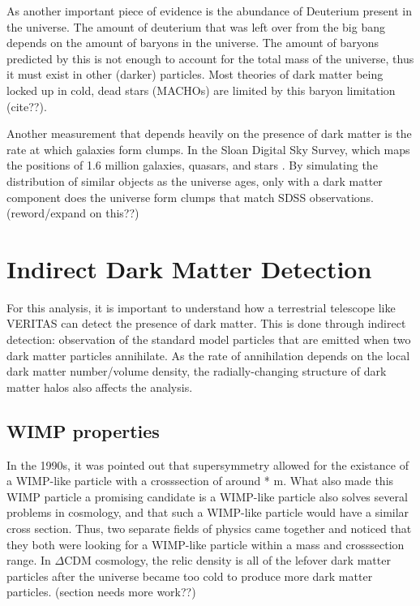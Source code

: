     As another important piece of evidence is the abundance of Deuterium present in the universe.
    The amount of deuterium that was left over from the big bang depends on the amount of baryons in the universe.
    The amount of baryons predicted by this is not enough to account for the total mass of the universe, thus it must exist in other (darker) particles.
    Most theories of dark matter being locked up in cold, dead stars (MACHOs) are limited by this baryon limitation (cite??).

    Another measurement that depends heavily on the presence of dark matter is the rate at which galaxies form clumps.
    In the Sloan Digital Sky Survey, which maps the positions of 1.6 million galaxies, quasars, and stars \cite{sdss_release}.
    By simulating the distribution of similar objects as the universe ages, only with a dark matter component does the universe form clumps that match SDSS observations.
    (reword/expand on this??)

\section{Indirect Dark Matter Detection}
  For this analysis, it is important to understand how a terrestrial telescope like VERITAS can detect the presence of dark matter.
  This is done through indirect detection: observation of the standard model particles that are emitted when two dark matter particles annihilate.
  As the rate of annihilation depends on the local dark matter number/volume density, the radially-changing structure of dark matter halos also affects the analysis.
  \subsection{WIMP properties}

    In the 1990s, it was pointed out that supersymmetry allowed for the existance of a WIMP-like particle with a crosssection of around  *  m.
    What also made this WIMP particle a promising candidate is a WIMP-like particle also solves several problems in cosmology, and that such a WIMP-like particle would have a similar cross section.
    Thus, two separate fields of physics came together and noticed that they both were looking for a WIMP-like particle within a mass and crosssection range.
    In $\Delta$CDM cosmology, the relic density is all of the lefover dark matter particles after the universe became too cold to produce more dark matter particles.
    (section needs more work??)

